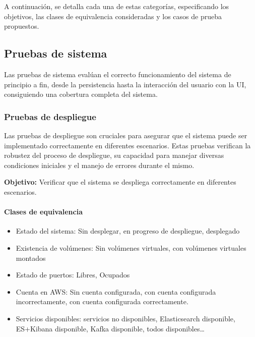 A continuación, se detalla cada una de estas categorías, especificando los
objetivos, las clases de equivalencia consideradas y los casos de prueba
propuestos.


\newpage{}
\subsection{Pruebas de sistema}
Las pruebas de sistema evalúan el correcto funcionamiento del sistema de
principio a fin, desde la persistencia hasta la interacción del usuario con la
UI, consiguiendo una cobertura completa del sistema.

\subsubsection{Pruebas de despliegue}
Las pruebas de despliegue son cruciales para asegurar que el sistema puede ser
implementado correctamente en diferentes escenarios. Estas pruebas verifican
la robustez del proceso de despliegue, su capacidad para manejar diversas
condiciones iniciales y el manejo de errores durante el mismo.

\textbf{Objetivo:} Verificar que el sistema se despliega correctamente en
diferentes escenarios.

\paragraph{Clases de equivalencia}
\begin{itemize}
    \item Estado del sistema: Sin desplegar, en progreso de despliegue,
		desplegado
    \item Existencia de volúmenes: Sin volúmenes virtuales, con volúmenes
		virtuales montados
    \item Estado de puertos: Libres, Ocupados
    \item Cuenta en AWS: Sin cuenta configurada, con cuenta configurada
        incorrectamente, con cuenta configurada correctamente.
    \item Servicios disponibles: servicios no disponibles, Elasticsearch disponible,
        ES+Kibana disponible, Kafka disponible, todos disponibles\ldots
\end{itemize}

